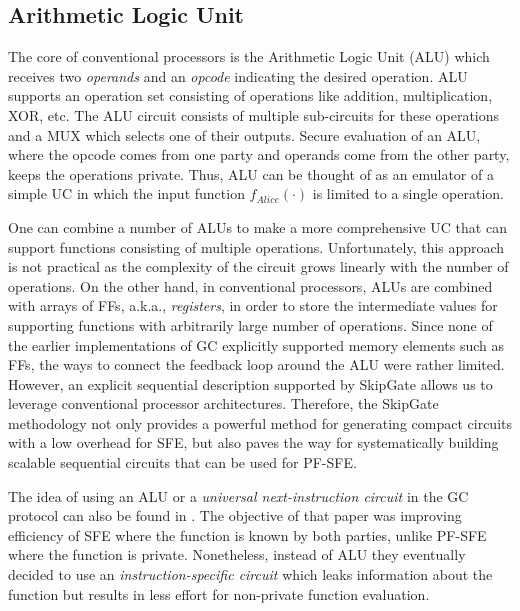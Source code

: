 \subsection{Arithmetic Logic Unit}
The core of conventional processors is the Arithmetic Logic Unit (ALU) which receives two \emph{operands} and an \emph{opcode} indicating the desired operation.
ALU supports an operation set consisting of operations like addition, multiplication, XOR, etc.
The ALU circuit consists of multiple sub-circuits for these operations and a MUX which selects one of their outputs.
Secure evaluation of an ALU, where the opcode comes from one party and operands come from the other party, keeps the operations private.
Thus, ALU can be thought of as an emulator of a simple UC in which the input function $f_{Alice}(\cdot)$ is limited to a single operation.

One can combine a number of ALUs to make a more comprehensive UC that can support functions consisting of multiple operations.
Unfortunately, this approach is not practical as the complexity of the circuit grows linearly with the number of operations.
On the other hand, in conventional processors, ALUs are combined with arrays of FFs, a.k.a., \emph{registers}, in order to store the intermediate values for supporting functions with arbitrarily large number of operations.
Since none of the earlier implementations of GC explicitly supported memory elements such as FFs, the ways to connect the feedback loop around the ALU were rather limited.
However, an explicit sequential description supported by SkipGate allows us to leverage conventional processor architectures.
Therefore, the SkipGate methodology not only provides a powerful method for generating compact circuits with a low overhead for SFE, but also paves the way for systematically building scalable sequential circuits that can be used for PF-SFE.

The idea of using an ALU or a \emph{universal next-instruction circuit} in the GC protocol can also be found in \cite{liu2014automating}.
The objective of that paper was improving efficiency of SFE where the function is known by both parties, unlike PF-SFE where the function is private.
Nonetheless, instead of ALU they eventually decided to use an \emph{instruction-specific circuit} which leaks information about the function but results in less effort for non-private function evaluation.

